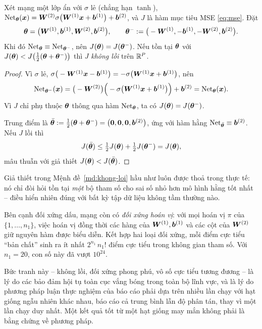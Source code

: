 \begin{menhde}
\label{md:khong-loi}
Xét mạng một lớp ẩn với $\sigma$ lẻ (chẳng hạn $\tanh$),
$\operatorname{Net}_{\bm{\theta}}(\bm{x}) = \bm{W}^{(2)}\sigma\big(\bm{W}^{(1)}\bm{x} + \bm{b}^{(1)}\big)
+ \bm{b}^{(2)}$, và $J$ là hàm mục tiêu MSE \eqref{eq:mse}. Đặt
\begin{equation}
\bm{\theta} = \big(\bm{W}^{(1)}, \bm{b}^{(1)}, \bm{W}^{(2)}, \bm{b}^{(2)}\big),
\qquad
\bm{\theta}^{-} := \big(-\bm{W}^{(1)}, -\bm{b}^{(1)}, -\bm{W}^{(2)}, \bm{b}^{(2)}\big).
\label{eq:doi-xung-dau}
\end{equation}
Khi đó $\operatorname{Net}_{\bm{\theta}} \equiv \operatorname{Net}_{\bm{\theta}^{-}}$, nên
$J(\bm{\theta}) = J(\bm{\theta}^{-})$. Nếu tồn tại $\bm{\theta}$ với
$J(\bm{\theta}) < J\big(\tfrac{1}{2}(\bm{\theta} + \bm{\theta}^{-})\big)$ thì $J$
\emph{không lồi} trên $\mathbb{R}^P$.
\end{menhde}
 
\begin{proof}
Vì $\sigma$ lẻ,
$\sigma\big(-\bm{W}^{(1)}\bm{x} - \bm{b}^{(1)}\big)
 = -\sigma\big(\bm{W}^{(1)}\bm{x} + \bm{b}^{(1)}\big)$, nên
\[
\operatorname{Net}_{\bm{\theta}^{-}}(\bm{x})
 = \big(-\bm{W}^{(2)}\big)\Big(-\sigma\big(\bm{W}^{(1)}\bm{x}+\bm{b}^{(1)}\big)\Big)
   + \bm{b}^{(2)} = \operatorname{Net}_{\bm{\theta}}(\bm{x}).
\]
Vì $J$ chỉ phụ thuộc $\bm{\theta}$ thông qua hàm $\operatorname{Net}_{\bm{\theta}}$, ta có
$J(\bm{\theta}) = J(\bm{\theta}^{-})$.
 
Trung điểm là $\bar{\bm{\theta}} := \tfrac12(\bm{\theta} + \bm{\theta}^{-})
 = \big(\bm{0},\bm{0},\bm{0},\bm{b}^{(2)}\big)$, ứng với hàm hằng
$\operatorname{Net}_{\bar{\bm{\theta}}} \equiv \bm{b}^{(2)}$. Nếu $J$ lồi thì
\[
J(\bar{\bm{\theta}}) \le \tfrac12 J(\bm{\theta}) + \tfrac12 J(\bm{\theta}^{-})
 = J(\bm{\theta}),
\]
mâu thuẫn với giả thiết $J(\bm{\theta}) < J(\bar{\bm{\theta}})$.
\end{proof}
 
\begin{nhanxet}
\label{nx:doi-xung-hoan-vi}
Giả thiết trong Mệnh đề~\ref{md:khong-loi} hầu như luôn được thoả trong thực tế:
nó chỉ đòi hỏi tồn tại \emph{một} bộ tham số cho sai số nhỏ hơn mô hình hằng tốt
nhất -- điều hiển nhiên đúng với bất kỳ tập dữ liệu không tầm thường nào.
 
Bên cạnh đối xứng dấu, mạng còn có \emph{đối xứng hoán vị}: với mọi hoán vị
$\pi$ của $\{1,\dots,n_1\}$, việc hoán vị đồng thời các hàng của
$\bm{W}^{(1)}, \bm{b}^{(1)}$ và các cột của $\bm{W}^{(2)}$ giữ nguyên hàm được biểu diễn.
Kết hợp hai loại đối xứng, mỗi điểm cực tiểu ``bản chất'' sinh ra ít nhất
$2^{n_1}\, n_1!$ điểm cực tiểu trong không gian tham số. Với $n_1 = 20$, con số
này đã vượt $10^{24}$.
 
Bức tranh này -- không lồi, đối xứng phong phú, vô số cực tiểu tương đương -- là
lý do các bảo đảm hội tụ toàn cục vắng bóng trong toàn bộ lĩnh vực, và là lý do
phương pháp luận thực nghiệm của báo cáo phải dựa trên nhiều lần chạy với hạt
giống ngẫu nhiên khác nhau, báo cáo cả trung bình lẫn độ phân tán, thay vì một
lần chạy duy nhất. Một kết quả tốt từ một hạt giống may mắn không phải là bằng
chứng về phương pháp.
\end{nhanxet}
 

